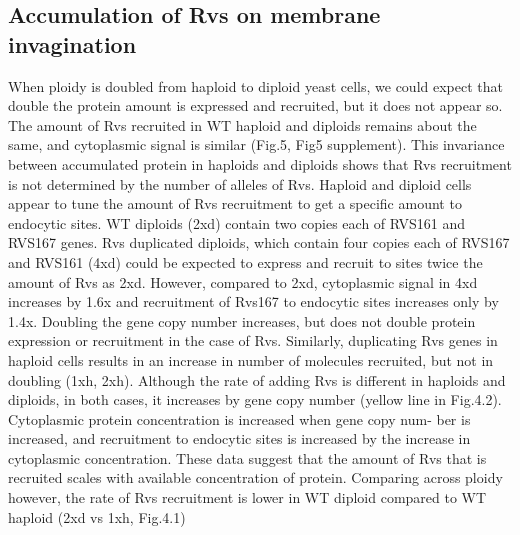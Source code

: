 \documentclass[9pt,lineno]{elife}
\begin{document}
\subsection{Accumulation of Rvs on membrane invagination}
When ploidy is doubled from haploid to diploid yeast cells, we could expect that double the protein amount is expressed and recruited, but it does not appear so. The amount of Rvs recruited in WT haploid  and diploids remains about the same, and cytoplasmic signal is similar (Fig.5, Fig5 supplement). This invariance between accumulated protein in haploids and diploids shows that Rvs recruitment is not determined by the number of alleles of Rvs. Haploid and diploid cells appear to tune the amount of Rvs recruitment to get a specific amount to endocytic sites.
WT diploids (2xd) contain two copies each of RVS161 and RVS167 genes. Rvs duplicated diploids, which contain four copies each of RVS167 and RVS161 (4xd) could be expected to express and recruit to sites twice the amount of Rvs as 2xd. However, compared to 2xd, cytoplasmic signal in 4xd increases by 1.6x and recruitment of Rvs167 to endocytic sites increases only by 1.4x. Doubling the gene copy number increases, but does not double protein expression or recruitment in the case of Rvs. Similarly, duplicating Rvs genes in haploid cells results in an increase in number of molecules recruited, but not in doubling (1xh, 2xh). Although the rate of adding Rvs is different in haploids and diploids, in both cases, it increases by gene copy number (yellow line in Fig.4.2).
Cytoplasmic protein concentration is increased when gene copy num- ber is increased, and recruitment to endocytic sites is increased by the increase in cytoplasmic concentration. These data suggest that the amount of Rvs that is recruited scales with available concentration of protein. Comparing across ploidy however, the rate of Rvs recruitment is lower in WT diploid compared to WT haploid (2xd vs 1xh, Fig.4.1)
\end{document}
